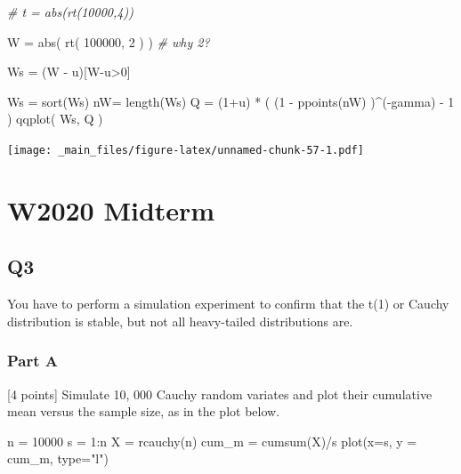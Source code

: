 \documentclass[
  oneside]{book}
\newenvironment{Shaded}{\begin{snugshade}}{\end{snugshade}}
\newcommand{\AttributeTok}[1]{\textcolor[rgb]{0.77,0.63,0.00}{#1}}
\newcommand{\CommentTok}[1]{\textcolor[rgb]{0.56,0.35,0.01}{\textit{#1}}}
\newcommand{\DecValTok}[1]{\textcolor[rgb]{0.00,0.00,0.81}{#1}}
\newcommand{\FunctionTok}[1]{\textcolor[rgb]{0.00,0.00,0.00}{#1}}
\newcommand{\NormalTok}[1]{#1}
\newcommand{\OtherTok}[1]{\textcolor[rgb]{0.56,0.35,0.01}{#1}}
\newcommand{\SpecialCharTok}[1]{\textcolor[rgb]{0.00,0.00,0.00}{#1}}
\newcommand{\StringTok}[1]{\textcolor[rgb]{0.31,0.60,0.02}{#1}}
\begin{document}
\begin{Shaded}
\begin{Highlighting}[]
\CommentTok{\# t = abs(rt(10000,4))}

\NormalTok{W }\OtherTok{=} \FunctionTok{abs}\NormalTok{( }\FunctionTok{rt}\NormalTok{( }\DecValTok{100000}\NormalTok{, }\DecValTok{2}\NormalTok{ ) ) }\CommentTok{\# why 2?}

\NormalTok{Ws }\OtherTok{=}\NormalTok{ (W }\SpecialCharTok{{-}}\NormalTok{ u)[W}\SpecialCharTok{{-}}\NormalTok{u}\SpecialCharTok{\textgreater{}}\DecValTok{0}\NormalTok{]}

\NormalTok{Ws }\OtherTok{=} \FunctionTok{sort}\NormalTok{(Ws)}
\NormalTok{nW}\OtherTok{=} \FunctionTok{length}\NormalTok{(Ws)}
\NormalTok{Q }\OtherTok{=}\NormalTok{ (}\DecValTok{1}\SpecialCharTok{+}\NormalTok{u) }\SpecialCharTok{*}\NormalTok{ ( (}\DecValTok{1} \SpecialCharTok{{-}} \FunctionTok{ppoints}\NormalTok{(nW) )}\SpecialCharTok{\^{}}\NormalTok{(}\SpecialCharTok{{-}}\NormalTok{gamma) }\SpecialCharTok{{-}} \DecValTok{1}\NormalTok{ ) }
\FunctionTok{qqplot}\NormalTok{( Ws, Q )}
\end{Highlighting}
\end{Shaded}

\texttt{[image: \_main\_files/figure-latex/unnamed-chunk-57-1.pdf]}

\hypertarget{w2020-midterm}{%
\chapter{W2020 Midterm}\label{w2020-midterm}}

\hypertarget{q3-6}{%
\section{Q3}\label{q3-6}}

You have to perform a simulation experiment to confirm that the t(1) or Cauchy distribution is stable, but not all heavy-tailed distributions are.

\hypertarget{part-a-15}{%
\subsection{Part A}\label{part-a-15}}

{[}4 points{]} Simulate 10, 000 Cauchy random variates and plot their cumulative mean versus the sample size, as in the plot below.

\begin{Shaded}
\begin{Highlighting}[]
\NormalTok{n }\OtherTok{=} \DecValTok{10000}
\NormalTok{s }\OtherTok{=} \DecValTok{1}\SpecialCharTok{:}\NormalTok{n}
\NormalTok{X }\OtherTok{=} \FunctionTok{rcauchy}\NormalTok{(n)}
\NormalTok{cum\_m }\OtherTok{=} \FunctionTok{cumsum}\NormalTok{(X)}\SpecialCharTok{/}\NormalTok{s}
\FunctionTok{plot}\NormalTok{(}\AttributeTok{x=}\NormalTok{s, }\AttributeTok{y =}\NormalTok{ cum\_m, }\AttributeTok{type=}\StringTok{"l"}\NormalTok{)}
\end{Highlighting}
\end{Shaded}
\end{document}
